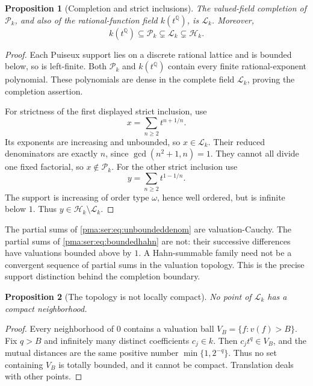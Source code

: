\documentclass[11pt]{article}
\numberwithin{equation}{section}
\newtheorem{proposition}[proposition]{Proposition}
\theoremstyle{definition}
\theoremstyle{remark}
\newcommand{\Q}{\mathbb Q}
\newcommand{\Pk}{\mathcal P_k}
\newcommand{\Lk}{\mathcal L_k}
\newcommand{\Hk}{\mathcal H_k}
\begin{document}
\begin{proposition}[Completion and strict inclusions]\label{pma:ser:prop:completion}
The valued-field completion of $\Pk$, and also of the rational-function
field $k(t^\Q)$, is $\Lk$. Moreover,
\[
 k(t^\Q)\subseteq\Pk\subsetneq\Lk\subsetneq\Hk.
\]
\end{proposition}
\begin{proof}
Each Puiseux support lies on a discrete rational lattice and is bounded
below, so is left-finite. Both $\Pk$ and $k(t^\Q)$ contain every finite
rational-exponent polynomial. These polynomials are dense in the complete
field $\Lk$, proving the completion assertion.

For strictness of the first displayed strict inclusion, use
\begin{equation}\label{pma:ser:eq:unboundeddenom}
 x=\sum_{n\geq2}t^{n+1/n}.
\end{equation}
Its exponents are increasing and unbounded, so $x\in\Lk$. Their reduced
denominators are exactly $n$, since $\gcd(n^2+1,n)=1$. They cannot all divide
one fixed factorial, so $x\notin\Pk$.
For the other strict inclusion use
\begin{equation}\label{pma:ser:eq:boundedhahn}
 y=\sum_{n\geq2}t^{1-1/n}.
\end{equation}
The support is increasing of order type $\omega$, hence well ordered,
but is infinite below $1$. Thus $y\in\Hk\setminus\Lk$.
\end{proof}

The partial sums of \eqref{pma:ser:eq:unboundeddenom} are valuation-Cauchy. The partial
sums of \eqref{pma:ser:eq:boundedhahn} are not: their successive differences have
valuations bounded above by $1$. A Hahn-summable family need not be a
convergent sequence of partial sums in the valuation topology. This is the
precise support distinction behind the completion boundary.

\begin{proposition}[The topology is not locally compact]\label{pma:ser:prop:notlccompact}
No point of $\Lk$ has a compact neighborhood.
\end{proposition}
\begin{proof}
Every neighborhood of $0$ contains a valuation ball
$V_B=\{f:v(f)>B\}$. Fix $q>B$ and infinitely many distinct coefficients
$c_j\in k$. Then $c_jt^q\in V_B$, and the mutual distances are the same
positive number $\min\{1,2^{-q}\}$. Thus no set containing $V_B$ is totally
bounded, and it cannot be compact. Translation deals with other points.
\end{proof}
\end{document}
